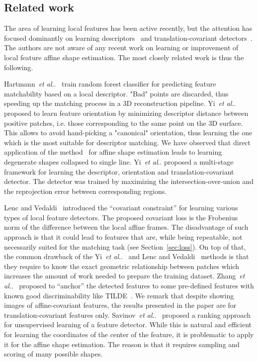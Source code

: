 \documentclass[runningheads]{llncs}
\makeatletter
\DeclareRobustCommand\onedot{\futurelet\@let@token\@onedot}
\def\@onedot{\ifx\@let@token.\else.\null\fi\xspace}
\def\etal{\emph{et al}\onedot}
\makeatother
\begin{document}
\subsection{Related work}
The area of learning local features has been active recently, but the attention has focused dominantly on  learning descriptors~\cite{DeepComp2015,MatchNet2015,TFeat2016,L2Net2017,HardNet2017,SpreadDesc2017,ExemplarNet2016} and translation-covariant detectors~\cite{TIlde2015,NewTilde2017,Lenc2016,QuadNets2017}. The authors are not aware of any recent work on learning or improvement of local feature affine shape estimation. 
The most closely related work is thus the following.

Hartmann~\etal~\cite{HartmannHS14} train random forest classifier for predicting feature matchability based on a local descriptor. "Bad" points are discarded, thus speeding up the matching process in a 3D reconstruction  pipeline. 
Yi~\etal\cite{OriNet2016} proposed to learn feature orientation by minimizing descriptor distance between positive patches, i.e. those corresponding to the same point on the 3D surface. This allows to avoid hand-picking a "canonical" orientation, thus learning the one which is the most suitable for descriptor matching.  We have observed that direct application of the method~\cite{OriNet2016}  for affine shape estimation leads to learning degenerate shapes collapsed to single line. 
Yi~\etal\cite{LIFT2016} proposed a multi-stage framework for learning  the descriptor, orientation and translation-covariant detector. The detector was trained by maximizing the intersection-over-union and the reprojection error between corresponding regions.

Lenc and Vedaldi~\cite{Lenc2016} introduced the ``covariant constraint'' for learning various types of local feature detectors. The proposed covariant loss is the Frobenius norm of the difference between  the local affine frames. The disadvantage of such approach is that it could lead to features that are, while being repeatable, not necessarily suited for the matching task (see Section~\ref{sec:loss}).
On top of that, the common drawback of the Yi~\etal~\cite{LIFT2016} and Lenc and Vedaldi~\cite{Lenc2016} methods is that they require to know the exact geometric relationship between patches which increases the amount of work needed to prepare the training dataset. 
Zhang~\etal~\cite{NewTilde2017} proposed to ``anchor'' the detected features to some pre-defined features with known good discriminability like TILDE~\cite{TIlde2015}. We remark that despite showing images of affine-covariant features, the results presented in the paper are for translation-covariant features only. 
Savinov~\etal~\cite{QuadNets2017} proposed a ranking approach for unsupervised learning of a feature detector. While this is natural and efficient for learning the coordinates of the center of the feature, it is problematic to apply it for the affine shape estimation. The reason is that it requires sampling and scoring of many possible shapes.
\end{document}
